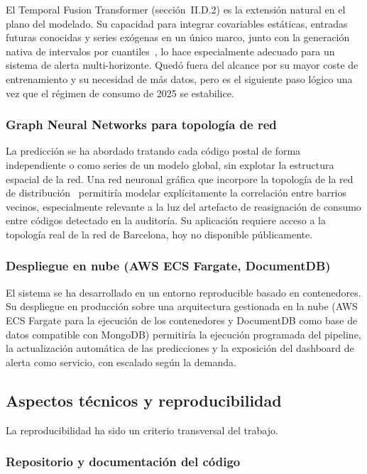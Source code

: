 \documentclass[12pt, a4paper]{article}
\begin{document}
El Temporal Fusion Transformer (sección~II.D.2) es la extensión natural en el plano del modelado. Su capacidad para integrar covariables estáticas, entradas futuras conocidas y series exógenas en un único marco, junto con la generación nativa de intervalos por cuantiles~\cite{lim2021}, lo hace especialmente adecuado para un sistema de alerta multi-horizonte. Quedó fuera del alcance por su mayor coste de entrenamiento y su necesidad de más datos, pero es el siguiente paso lógico una vez que el régimen de consumo de 2025 se estabilice.

\subsubsection{Graph Neural Networks para topología de red}

La predicción se ha abordado tratando cada código postal de forma independiente o como series de un modelo global, sin explotar la estructura espacial de la red. Una red neuronal gráfica que incorpore la topología de la red de distribución~\cite{suri2025} permitiría modelar explícitamente la correlación entre barrios vecinos, especialmente relevante a la luz del artefacto de reasignación de consumo entre códigos detectado en la auditoría. Su aplicación requiere acceso a la topología real de la red de Barcelona, hoy no disponible públicamente.

\subsubsection{Despliegue en nube (AWS ECS Fargate, DocumentDB)}

El sistema se ha desarrollado en un entorno reproducible basado en contenedores. Su despliegue en producción sobre una arquitectura gestionada en la nube (AWS ECS Fargate para la ejecución de los contenedores y DocumentDB como base de datos compatible con MongoDB) permitiría la ejecución programada del pipeline, la actualización automática de las predicciones y la exposición del dashboard de alerta como servicio, con escalado según la demanda.

\subsection{Aspectos técnicos y reproducibilidad}

La reproducibilidad ha sido un criterio transversal del trabajo.

\subsubsection{Repositorio y documentación del código}
\end{document}
